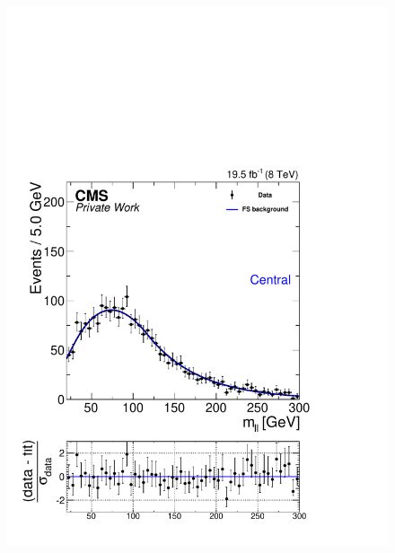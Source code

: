 \begin{figure}[!hbp]
\begin{minipage}[t]{0.49\textwidth}
    \includegraphics[width=\textwidth]{plots/results/fit/fit2012OFOS_ETHTriangle_SignalInclusive_Combined_Full2012_ETHTriangle_Central.pdf}
  \end{minipage}
  \begin{minipage}[t]{0.49\textwidth}

\end{minipage}
\end{figure}
